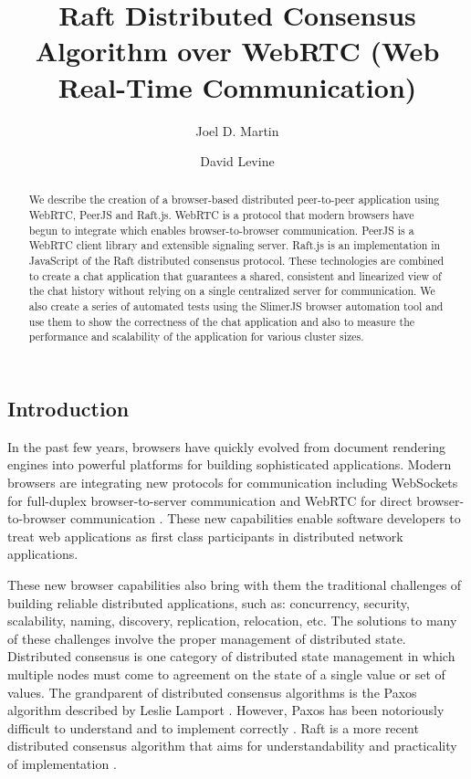 \documentclass[9pt]{extarticle}
\title{Raft Distributed Consensus Algorithm over WebRTC (Web Real-Time Communication)}
\author{Joel D. Martin}
\author{David Levine}
\affil{University of Texas at Arlington}
\begin{document}
\maketitle

\begin{multicols}{2}

\begin{abstract}
We describe the creation of a browser-based distributed peer-to-peer
application using WebRTC, PeerJS and Raft.js. WebRTC is a protocol
that modern browsers have begun to integrate which enables
browser-to-browser communication. PeerJS is a WebRTC client library
and extensible signaling server. Raft.js is an implementation in
JavaScript of the Raft distributed consensus protocol. These
technologies are combined to create a chat application that guarantees
a shared, consistent and linearized view of the chat history without
relying on a single centralized server for communication. We also
create a series of automated tests using the SlimerJS browser
automation tool and use them to show the correctness of the chat
application and also to measure the performance and scalability of the
application for various cluster sizes.
\end{abstract}

\section{Introduction}
In the past few years, browsers have quickly evolved from document
rendering engines into powerful platforms for building sophisticated
applications. Modern browsers are integrating new protocols for
communication including WebSockets for full-duplex browser-to-server
communication \cite{websockets:rfc6455} and WebRTC for direct
browser-to-browser communication \cite{webrtc:feb2015}. These new
capabilities enable software developers to treat web applications as
first class participants in distributed network applications.

These new browser capabilities also bring with them the traditional
challenges of building reliable distributed applications, such as:
concurrency, security, scalability, naming, discovery, replication,
relocation, etc. The solutions to many of these challenges involve
the proper management of distributed state. Distributed consensus is
one category of distributed state management in which multiple nodes
must come to agreement on the state of a single value or set of values. %
The grandparent of distributed consensus algorithms is the Paxos
algorithm described by Leslie Lamport \cite{paxos:lamport98}. However,
Paxos has been notoriously difficult to understand and to implement
correctly \cite{paxos:chandra07}. Raft is a more recent distributed
consensus algorithm that aims for understandability and practicality
of implementation \cite{raft_thesis:ongaro14}.


\end{multicols}
\end{document}
